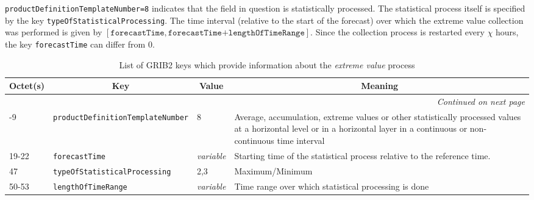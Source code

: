 \texttt{productDefinitionTemplateNumber=8} indicates that the field in question is statistically processed. The statistical process itself 
is specified by the key \texttt{typeOfStatisticalProcessing}. The time interval (relative to the start of the forecast) over which the 
extreme value collection was performed is given by $[\texttt{forecastTime},\texttt{forecastTime+lengthOfTimeRange}]$. 
Since the collection process is restarted every $\chi$ hours, the key \texttt{forecastTime} can differ from 0. 

\begin{longtable}{p{1.2cm}p{5.5cm}p{1.0cm}p{6.0cm}}
\caption[]{List of GRIB2 keys which provide information about the \emph{extreme value} process}\label{tab_GRIB2extreme}\\
  \toprule
\multicolumn{1}{c}{\textbf{Octet(s)}}  &  \multicolumn{1}{c}{\textbf{Key}}  & \multicolumn{1}{c}{\textbf{Value}} & \multicolumn{1}{c}{\textbf{Meaning}} \\
\midrule
\endhead
\hline \multicolumn{4}{r}{\textit{Continued on next page}} \\
\endfoot
\endlastfoot
 8-9        &  \texttt{productDefinitionTemplateNumber}             &     8               &    Average, accumulation, extreme values or other statistically processed values at a horizontal level or in a horizontal layer in a continuous or non-continuous time interval   \\
 19-22      &  \texttt{forecastTime}                                &    \emph{variable}  &    Starting time of the statistical process relative to the reference time. \\
 47         &  \texttt{typeOfStatisticalProcessing}                 &     2,3             &    Maximum/Minimum                                  \\
 50-53      &  \texttt{lengthOfTimeRange}                           &    \emph{variable}  &    Time range over which statistical processing is done \\
\bottomrule
\end{longtable}



